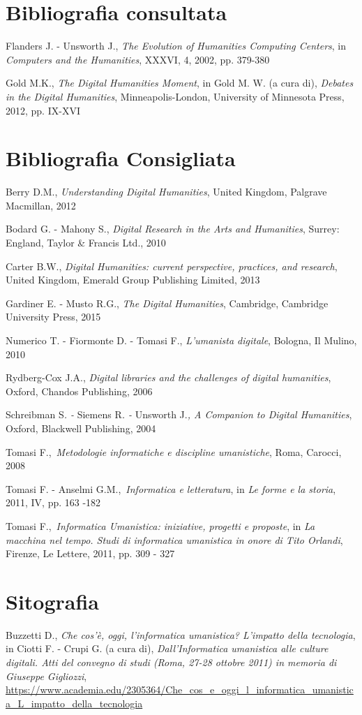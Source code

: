 {{\section*{Bibliografia consultata}
{\parindent0pt 
Flanders J. - Unsworth J., \emph{The Evolution of Humanities Computing
Centers}, in \emph{Computers and the Humanities}, XXXVI, 4, 2002, pp.
379-380

Gold M.K., \emph{The Digital Humanities Moment}, in Gold M. W. (a cura
di), \emph{Debates in the Digital Humanities}, Minneapolis-London,
University of Minnesota Press, 2012, pp. IX-XVI
}

\section*{Bibliografia Consigliata}
{\parindent0pt 
Berry D.M., \emph{Understanding Digital Humanities}, United Kingdom,
Palgrave Macmillan, 2012

Bodard G. - Mahony S., \emph{Digital Research in the Arts and
Humanities}, Surrey: England, Taylor \& Francis Ltd., 2010

Carter B.W., \emph{Digital Humanities: current perspective, practices,
and research}, United Kingdom, Emerald Group Publishing Limited, 2013

Gardiner E. - Musto R.G., \emph{The Digital Humanities}, Cambridge,
Cambridge University Press, 2015

Numerico T. - Fiormonte D. - Tomasi F., \emph{L'umanista digitale},
Bologna, Il Mulino, 2010

Rydberg-Cox J.A., \emph{Digital libraries and the challenges of digital
humanities}, Oxford, Chandos Publishing, 2006

Schreibman S\emph{. -} Siemens R\emph{. -} Unsworth J.\emph{, A
Companion to Digital Humanities}, Oxford, Blackwell Publishing, 2004

Tomasi F.,~\emph{Metodologie informatiche e discipline umanistiche},
Roma, Carocci, 2008

Tomasi F. - Anselmi G.M.,~\emph{Informatica e letteratura}, in \emph{Le
forme e la storia}, 2011, IV, pp. 163 -182

Tomasi F.,~\emph{Informatica Umanistica: iniziative, progetti e
proposte}, in \emph{La macchina nel tempo. Studi di informatica
umanistica in onore di Tito Orlandi}, Firenze, Le Lettere, 2011, pp. 309
- 327
}

\section*{Sitografia}
{\parindent0pt 
Buzzetti D., \emph{Che cos'è, oggi, l'informatica umanistica? L'impatto
della tecnologia}, in Ciotti F. - Crupi G. (a cura di),
\emph{Dall'Informatica umanistica alle culture digitali. Atti del
convegno di studi (Roma, 27-28 ottobre 2011) in memoria di Giuseppe
Gigliozzi},
\url{https://www.academia.edu/2305364/Che_cos_e_oggi_l_informatica_umanistica_L_impatto_della_tecnologia}

}}}
